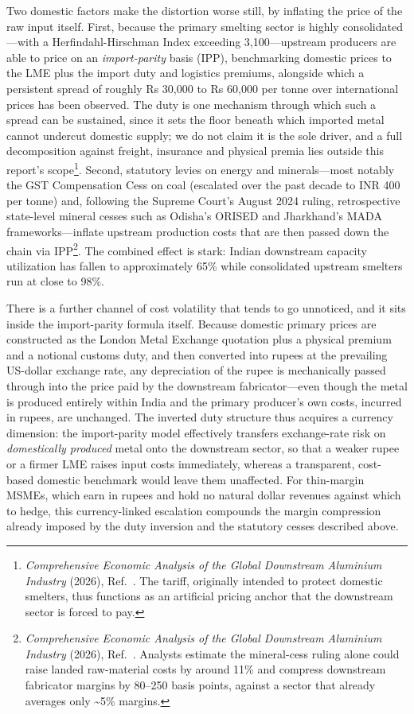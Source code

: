 \documentclass[11pt, a4paper]{article}
\numberwithin{figure}{section}
\numberwithin{table}{section}
\begin{document}
Two domestic factors make the distortion worse still, by inflating the price of the raw input itself. First, because the primary smelting sector is highly consolidated—with a Herfindahl-Hirschman Index exceeding 3,100—upstream producers are able to price on an \textit{import-parity} basis (IPP), benchmarking domestic prices to the LME plus the import duty and logistics premiums, alongside which a persistent spread of roughly Rs 30,000 to Rs 60,000 per tonne over international prices has been observed. The duty is one mechanism through which such a spread can be sustained, since it sets the floor beneath which imported metal cannot undercut domestic supply; we do not claim it is the sole driver, and a full decomposition against freight, insurance and physical premia lies outside this report's scope\footnote{\textit{Comprehensive Economic Analysis of the Global Downstream Aluminium Industry} (2026), Ref.~\cite{costreg2026}. The tariff, originally intended to protect domestic smelters, thus functions as an artificial pricing anchor that the downstream sector is forced to pay.}. Second, statutory levies on energy and minerals—most notably the GST Compensation Cess on coal (escalated over the past decade to INR 400 per tonne) and, following the Supreme Court's August 2024 ruling, retrospective state-level mineral cesses such as Odisha's ORISED and Jharkhand's MADA frameworks—inflate upstream production costs that are then passed down the chain via IPP\footnote{\textit{Comprehensive Economic Analysis of the Global Downstream Aluminium Industry} (2026), Ref.~\cite{costreg2026}. Analysts estimate the mineral-cess ruling alone could raise landed raw-material costs by around 11\% and compress downstream fabricator margins by 80--250 basis points, against a sector that already averages only \textasciitilde5\% margins.}. The combined effect is stark: Indian downstream capacity utilization has fallen to approximately 65\% while consolidated upstream smelters run at close to 98\%.

There is a further channel of cost volatility that tends to go unnoticed, and it sits inside the import-parity formula itself. Because domestic primary prices are constructed as the London Metal Exchange quotation plus a physical premium and a notional customs duty, and then converted into rupees at the prevailing US-dollar exchange rate, any depreciation of the rupee is mechanically passed through into the price paid by the downstream fabricator---even though the metal is produced entirely within India and the primary producer's own costs, incurred in rupees, are unchanged. The inverted duty structure thus acquires a currency dimension: the import-parity model effectively transfers exchange-rate risk on \emph{domestically produced} metal onto the downstream sector, so that a weaker rupee or a firmer LME raises input costs immediately, whereas a transparent, cost-based domestic benchmark would leave them unaffected. For thin-margin MSMEs, which earn in rupees and hold no natural dollar revenues against which to hedge, this currency-linked escalation compounds the margin compression already imposed by the duty inversion and the statutory cesses described above.
\end{document}
